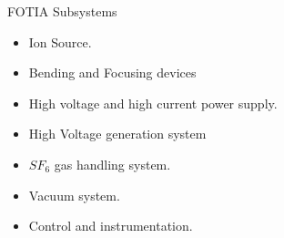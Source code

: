 \documentclass[11pt]{beamer}
\begin{document}
\begin{frame}{FOTIA Subsystems}

  \begin{itemize}
   
    \item Ion Source.
    \item Bending and Focusing devices
    \item High voltage and high current power supply.
    \item High Voltage generation system
    \item $SF_{6}$ gas handling system.
    \item Vacuum system.
    \item Control and instrumentation.
   \end{itemize}

\end{frame}
\end{document}
